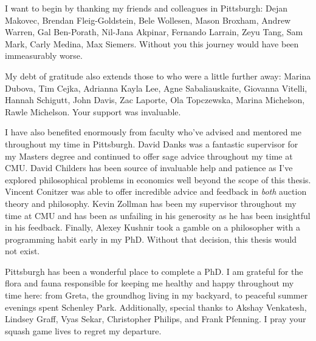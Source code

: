 \documentclass{cmuthesis}
\newcounter{fig}
\begin{document}
\begin{acknowledgments}
I want to begin by thanking my friends and colleagues in Pittsburgh: Dejan Makovec, Brendan Fleig-Goldstein, Bele Wollesen, Mason Broxham, Andrew Warren, Gal Ben-Porath, Nil-Jana Akpinar, Fernando Larrain, Zeyu Tang, Sam Mark, Carly Medina, Max Siemers. Without you this journey would have been immeasurably worse.

My debt of gratitude also extends those to who were a little further away: Marina Dubova, Tim Cejka, Adrianna Kayla Lee, Agne Sabaliauskaite, Giovanna Vitelli, Hannah Schigutt, John Davis, Zac Laporte, Ola Topczewska, Marina Michelson, Rawle Michelson. Your support was invaluable.


I have also benefited enormously from faculty who've advised and mentored me throughout my time in Pittsburgh. David Danks was a fantastic supervisor for my Masters degree and continued to offer sage advice throughout my time at CMU. David Childers has been source of invaluable help and patience as I've explored philosophical problems in economics well beyond the scope of this thesis. Vincent Conitzer was able to offer incredible advice and feedback in \textit{both} auction theory and philosophy. Kevin Zollman has been my supervisor throughout my time at CMU and has been as unfailing in his generosity as he has been insightful in his feedback. Finally, Alexey Kushnir took a gamble on a philosopher with a programming habit early in my PhD. Without that decision, this thesis would not exist.

Pittsburgh has been a wonderful place to complete a PhD. I am grateful for the flora and fauna responsible for keeping me healthy and happy throughout my time here: from Greta, the groundhog living in my backyard, to peaceful summer evenings spent Schenley Park. Additionally, special thanks to Akshay Venkatesh, Lindsey Graff, Vyas Sekar, Christopher Philips, and Frank Pfenning. I pray your squash game lives to regret my departure.
\end{acknowledgments}


\pagestyle{plain}

\tableofcontents
{}
{}

\mainmatter










\end{document}
